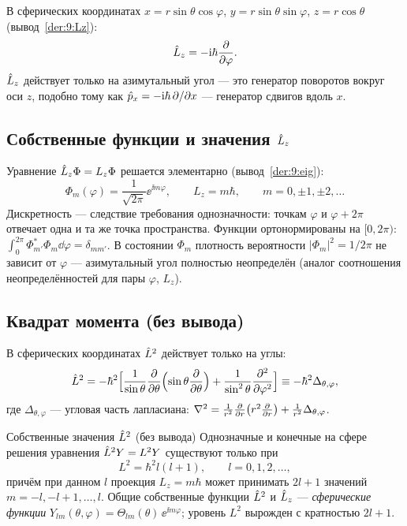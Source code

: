 В сферических координатах $x=r\sin\theta\cos\varphi$, $y=r\sin\theta\sin\varphi$, $z=r\cos\theta$
(вывод~\ref{der:9:Lz}):
\begin{equation}\label{eq:9:Lzsph}
  \hat{L}_z=-\mathrm{i}\hbar\frac{\partial }{\partial \varphi}.
\end{equation}
$\hat{L}_z$ действует только на азимутальный угол — это генератор поворотов вокруг оси $z$, подобно тому
как $\hat{p}_x=-\mathrm{i}\hbar\,\partial/\partial x$ — генератор сдвигов вдоль $x$.

\subsection{Собственные функции и значения $\hat{L}_z$}

Уравнение $\hat{L}_z\Phi=L_z\Phi$ решается элементарно (вывод~\ref{der:9:eig}):
\begin{equation}\label{eq:9:Phim}
  \Phi_m(\varphi)=\frac{1}{\sqrt{2\pi}}\ee^{\ii m\varphi},\qquad L_z=m\hbar,\qquad m=0,\pm1,\pm2,\dots
\end{equation}
Дискретность — следствие требования однозначности: точкам $\varphi$ и $\varphi+2\pi$ отвечает одна и та же
точка пространства. Функции ортонормированы на $[0,2\pi)$:
$\int_0^{2\pi}\Phi_{m'}^*\Phi_m\dd\varphi=\delta_{mm'}$. В состоянии $\Phi_m$ плотность вероятности
$|\Phi_m|^2=1/2\pi$ не зависит от $\varphi$ — азимутальный угол полностью неопределён (аналог
соотношения неопределённостей для пары $\varphi$, $L_z$).

\subsection{Квадрат момента (без вывода)}

В сферических координатах $\hat{L}^2$ действует только на углы:
\begin{equation}\label{eq:9:L2}
  \hat{L}^2=-\hbar^2\Bigl[\frac{1}{\sin\theta}\frac{\partial }{\partial \theta}\Bigl(\sin\theta\frac{\partial }{\partial \theta}\Bigr)
  +\frac{1}{\sin^2\theta}\frac{\partial ^2}{\partial \varphi^2}\Bigr]\equiv-\hbar^2\Delta_{\theta,\varphi},
\end{equation}
где $\Delta_{\theta,\varphi}$ — угловая часть лапласиана: $\nabla^2=\frac{1}{r^2}\frac{\partial }{\partial r}\bigl(r^2\frac{\partial }{\partial r}\bigr)+\frac{1}{r^2}\Delta_{\theta,\varphi}$.

\begin{principle}{Собственные значения $\hat{L}^2$ (без вывода)}
Однозначные и конечные на сфере решения уравнения $\hat{L}^2Y=L^2Y$ существуют только при
\begin{equation}\label{eq:9:L2eig}
  L^2=\hbar^2l(l+1),\qquad l=0,1,2,\dots,
\end{equation}
причём при данном $l$ проекция $L_z=m\hbar$ может принимать $2l+1$ значений $m=-l,-l+1,\dots,l$.
Общие собственные функции $\hat{L}^2$ и $\hat{L}_z$ — \emph{сферические функции}
$Y_{lm}(\theta,\varphi)=\Theta_{lm}(\theta)\,\ee^{\ii m\varphi}$; уровень $L^2$ вырожден с кратностью $2l+1$.
\end{principle}

